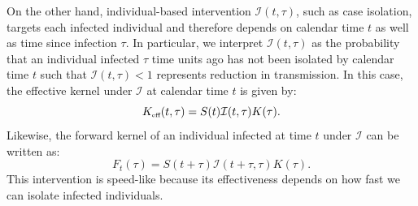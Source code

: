 \documentclass[12pt]{article}
\newcommand{\tsub}[2]{#1_{{\textrm{\tiny #2}}}}
\newcommand{\Keff}{\ensuremath{\tsub{K}{eff}}\xspace}
\newcommand{\II}{{\mathcal I}}
\begin{document}
On the other hand, individual-based intervention $\II(t, \tau)$, such as case isolation, targets each infected individual and therefore depends on calendar time $t$ as well as time since infection $\tau$.
In particular, we interpret $\II(t,\tau)$ as the probability that an individual infected $\tau$ time units ago has not been isolated by calendar time $t$ such that $\II(t, \tau) < 1$ represents reduction in transmission.
In this case, the effective kernel under $\II$ at calendar time $t$ is given by:
\begin{equation}
\Keff(t, \tau) = S(t) \II(t, \tau) K(\tau).
\end{equation}
Likewise, the forward kernel of an individual infected at time $t$ under $\II$ can be written as:
\begin{equation}
F_t(\tau) = S(t+\tau) \II(t+\tau, \tau) K(\tau).
\end{equation}
This intervention is speed-like because its effectiveness depends on how fast we can isolate infected individuals.
\end{document}
